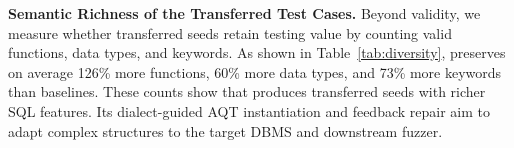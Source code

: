 \documentclass[conference]{IEEEtran}
\begin{document}
\textbf{Semantic Richness of the Transferred Test Cases.}
Beyond validity, we measure whether transferred seeds retain testing value by counting valid functions, data types, and keywords.
As shown in Table~\ref{tab:diversity}, \tool{} preserves on average 126\% more functions, 60\% more data types, and 73\% more keywords than baselines.
These counts show that \tool{} produces transferred seeds with richer SQL features.
Its dialect-guided AQT instantiation and feedback repair aim to adapt complex structures to the target DBMS and downstream fuzzer.

\end{document}
